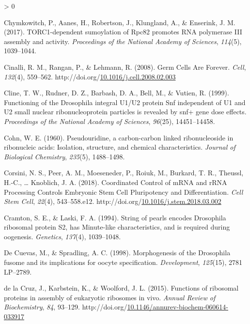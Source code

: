 \documentclass[12pt,oneside]{reedthesis}
\newlength{\cslhangindent}
\newenvironment{CSLReferences}[2] %
 {%
  \setlength{\parindent}{0pt}
  \ifodd #1 \everypar{\setlength{\hangindent}{\cslhangindent}}\ignorespaces\fi
  \ifnum #2 > 0
  \setlength{\parskip}{#2\baselineskip}
  \fi
 }%
 {}
\begin{document}
\begin{CSLReferences}{1}{0}
\leavevmode\hypertarget{ref-Chymkowitch2017a}{}%
Chymkowitch, P., Aanes, H., Robertson, J., Klungland, A., \& Enserink, J. M. (2017). {TORC1}-dependent sumoylation of {Rpc82} promotes {RNA} polymerase {III} assembly and activity. \emph{Proceedings of the National Academy of Sciences}, \emph{114}(5), 1039--1044.

\leavevmode\hypertarget{ref-Cinalli2008d}{}%
Cinalli, R. M., Rangan, P., \& Lehmann, R. (2008). Germ {Cells Are Forever}. \emph{Cell}, \emph{132}(4), 559--562. http://doi.org/\href{https://doi.org/10.1016/j.cell.2008.02.003}{10.1016/j.cell.2008.02.003}

\leavevmode\hypertarget{ref-Cline1999}{}%
Cline, T. W., Rudner, D. Z., Barbash, D. A., Bell, M., \& Vutien, R. (1999). Functioning of the {Drosophila} integral {U1}/{U2} protein {Snf} independent of {U1} and {U2} small nuclear ribonucleoprotein particles is revealed by snf+ gene dose effects. \emph{Proceedings of the National Academy of Sciences}, \emph{96}(25), 14451--14458.

\leavevmode\hypertarget{ref-Cohn1960}{}%
Cohn, W. E. (1960). Pseudouridine, a carbon-carbon linked ribonucleoside in ribonucleic acids: Isolation, structure, and chemical characteristics. \emph{Journal of Biological Chemistry}, \emph{235}(5), 1488--1498.

\leavevmode\hypertarget{ref-corsiniCoordinatedControlMRNA2018}{}%
Corsini, N. S., Peer, A. M., Moeseneder, P., Roiuk, M., Burkard, T. R., Theussl, H.-C., \ldots{} Knoblich, J. A. (2018). Coordinated {Control} of {mRNA} and {rRNA Processing Controls Embryonic Stem Cell Pluripotency} and {Differentiation}. \emph{Cell Stem Cell}, \emph{22}(4), 543--558.e12. http://doi.org/\href{https://doi.org/10.1016/j.stem.2018.03.002}{10.1016/j.stem.2018.03.002}

\leavevmode\hypertarget{ref-Cramton1994a}{}%
Cramton, S. E., \& Laski, F. A. (1994). String of pearls encodes {Drosophila} ribosomal protein {S2}, has {Minute}-like characteristics, and is required during oogenesis. \emph{Genetics}, \emph{137}(4), 1039--1048.

\leavevmode\hypertarget{ref-DeCuevas1998f}{}%
De Cuevas, M., \& Spradling, A. C. (1998). Morphogenesis of the {Drosophila} fusome and its implications for oocyte specification. \emph{Development}, \emph{125}(15), 2781 LP--2789.

\leavevmode\hypertarget{ref-delacruzFunctionsRibosomalProteins2015}{}%
de la Cruz, J., Karbstein, K., \& Woolford, J. L. (2015). Functions of ribosomal proteins in assembly of eukaryotic ribosomes in vivo. \emph{Annual Review of Biochemistry}, \emph{84}, 93--129. http://doi.org/\href{https://doi.org/10.1146/annurev-biochem-060614-033917}{10.1146/annurev-biochem-060614-033917}


\end{CSLReferences}
\end{document}
